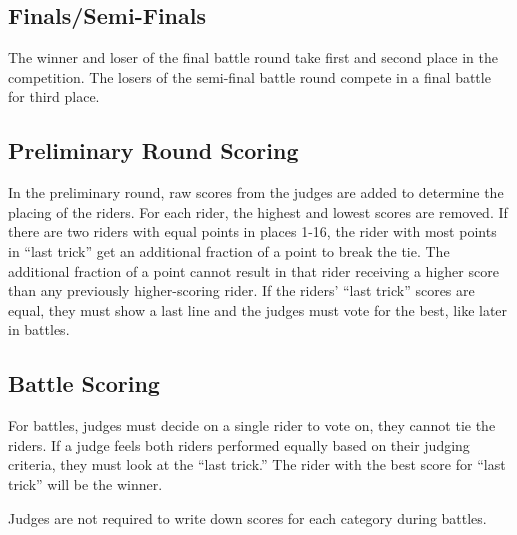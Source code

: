 \subsection{Finals/Semi-Finals}
The winner and loser of the final battle round take first and second place in the competition. The losers of the semi-final battle round compete in a final battle for third place.

\subsection{Preliminary Round Scoring}
In the preliminary round, raw scores from the judges are added to determine the placing of the riders.
For each rider, the highest and lowest scores are removed. %
If there are two riders with equal points in places 1-16, the rider with most points in ``last trick'' get an additional fraction of a point to break the tie.
The additional fraction of a point cannot result in that rider receiving a higher score than any previously higher-scoring rider.
If the riders' ``last trick'' scores are equal, they must show a last line and the judges must vote for the best, like later in battles.

\subsection{Battle Scoring}
For battles, judges must decide on a single rider to vote on, they cannot tie the riders.
If a judge feels both riders performed equally based on their judging criteria, they must look at the ``last trick.''
The rider with the best score for ``last trick'' will be the winner.

Judges are not required to write down scores for each category during battles.
